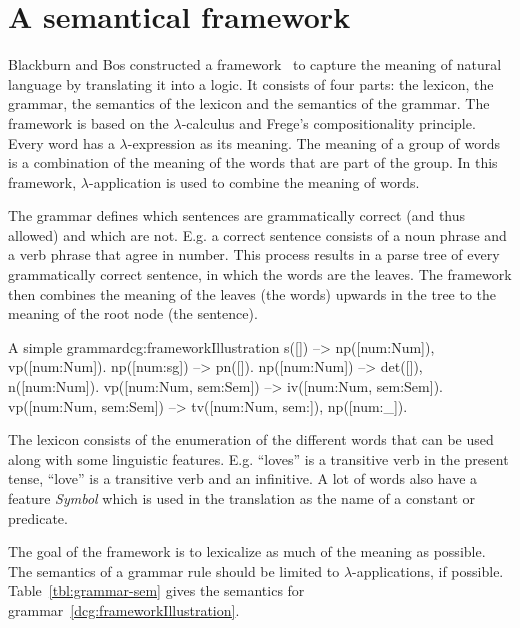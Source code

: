 \section{A semantical framework}
Blackburn and Bos constructed a framework~\cite{Blackburn2005, Blackburn2006} to capture the meaning of natural language by translating it into a logic. It consists of four parts: the lexicon, the grammar, the semantics of the lexicon and the semantics of the grammar. The framework is based on the $\lambda$-calculus and Frege's compositionality principle. Every word has a $\lambda$-expression as its meaning. The meaning of a group of words is a combination of the meaning of the words that are part of the group. In this framework, $\lambda$-application is used to combine the meaning of words.

The grammar defines which sentences are grammatically correct (and thus allowed) and which are not. E.g. a correct sentence consists of a noun phrase and a verb phrase that agree in number. This process results in a parse tree of every grammatically correct sentence, in which the words are the leaves. The framework then combines the meaning of the leaves (the words) upwards in the tree to the meaning of the root node (the sentence).

\begin{dcg}{A simple grammar}{dcg:frameworkIllustration}
s([]) -->
  np([num:Num]),
  vp([num:Num]).
np([num:sg]) -->
  pn([]).
np([num:Num]) -->
  det([]),
  n([num:Num]).
vp([num:Num, sem:Sem]) -->
  iv([num:Num, sem:Sem]).
vp([num:Num, sem:Sem]) -->
  tv([num:Num, sem:]),
  np([num:_]).
\end{dcg}

The lexicon consists of the enumeration of the different words that can be used along with some linguistic features. E.g. ``loves'' is a transitive verb in the present tense, ``love'' is a transitive verb and an infinitive. A lot of words also have a feature \textit{Symbol} which is used in the translation as the name of a constant or predicate.

The goal of the framework is to lexicalize as much of the meaning as possible. The semantics of a grammar rule should be limited to $\lambda$-applications, if possible. Table~\ref{tbl:grammar-sem} gives the semantics for grammar~\ref{dcg:frameworkIllustration}.

